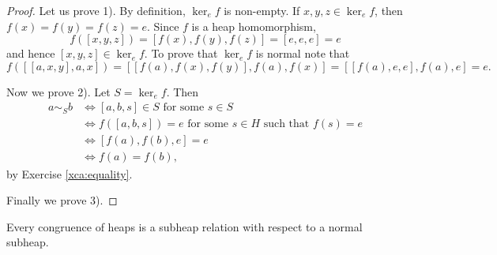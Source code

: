 \documentclass[graybox]{svmult}
\begin{document}
\begin{proof}
    Let us prove 1). By definition, $\ker_ef$ is non-empty. If $x,y,z\in\ker_ef$, then 
    $f(x)=f(y)=f(z)=e$. Since $f$ is a heap homomorphism, 
    \[
    f([x,y,z])=[f(x),f(y),f(z)]=[e,e,e]=e
    \]
    and hence $[x,y,z]\in\ker_ef$. To prove that $\ker_ef$ is normal
    note that
    \[
    f\left(\left[ [a,x,y],a,x\right]\right)
    =\left[ [f(a),f(x),f(y)],f(a),f(x)\right]
    =\left[ [f(a),e, e],f(a),e\right]=e.
    \]
    
    Now we prove 2). Let $S=\ker_ef$. Then 
    \begin{align*}
        a\sim_Sb &\Longleftrightarrow [a,b,s]\in S\text{ for some $s\in S$}\\
        & \Longleftrightarrow f([a,b,s])=e\text{ for some $s\in H$ such that $f(s)=e$}\\
        & \Longleftrightarrow [f(a),f(b),e]=e\\
        & \Longleftrightarrow f(a)=f(b),
    \end{align*}
    by Exercise \ref{xca:equality}. 
    
    Finally we prove 3). 
\end{proof}

\begin{corollary}
    Every congruence of heaps is a subheap relation with respect to a normal subheap.  
\end{corollary}




\end{document}
